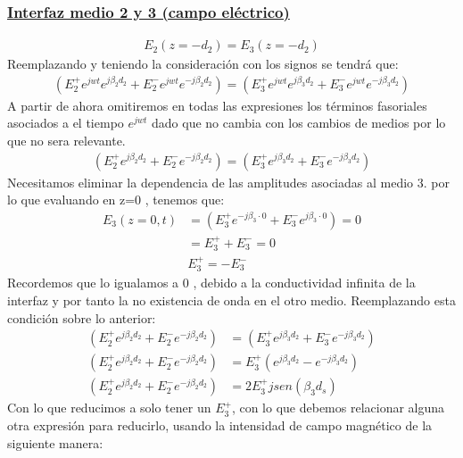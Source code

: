 \documentclass[
  11pt,
  letterpaper,
   addpoints,
   answers
  ]{exam}
\begin{document}
\begin{questions}
\begin{solution}
\begin{enumerate}
            \subsubsection*{\underline{Interfaz medio 2 y 3 (campo eléctrico)}}
            \begin{align}
                E_{2}(z=-d_{2}) = E_{3}(z=-d_{2})
            \end{align}
            Reemplazando y teniendo la consideración con los signos se tendrá que:
            \begin{align}
                (E_{2}^{+}e^{jwt}e^{j\beta_{2} d_{2}} + E_{2}^{-}e^{jwt}e^{-j\beta_{2} d_{2}})=(E_{3}^{+}e^{jwt}e^{j\beta_{3} d_{2}} + E_{3}^{-}e^{jwt}e^{-j\beta_{3} d_{2}}) 
            \end{align}
            A partir de ahora omitiremos en todas las expresiones los términos fasoriales asociados a el tiempo $e^{jwt}$ dado que no cambia con los cambios de medios por lo que no sera relevante.
            \begin{align}
                (E_{2}^{+}e^{j\beta_{2} d_{2}} + E_{2}^{-}e^{-j\beta_{2} d_{2}})=(E_{3}^{+}e^{j\beta_{3} d_{2}} + E_{3}^{-}e^{-j\beta_{3} d_{2}}) 
            \end{align}
            Necesitamos eliminar la dependencia de las amplitudes asociadas al medio 3. por lo que evaluando en z=0 , tenemos que:
            \begin{align}
                E_{3}(z=0,t) &= (E_{3}^{+}e^{-j\beta_{3} \cdot 0} + E_{3}^{-}e^{j\beta_{3} \cdot 0}) = 0\\
                      &= E_{3}^{+} + E_{3}^{-} = 0\\
                      &E_{3}^{+} = -E_{3}^{-}
            \end{align}
            Recordemos que lo igualamos a 0 , debido a la conductividad infinita de la interfaz y por tanto la no existencia de onda en el otro medio. Reemplazando esta condición sobre lo anterior:
            \begin{align}
                (E_{2}^{+}e^{j\beta_{2} d_{2}} + E_{2}^{-}e^{-j\beta_{2} d_{2}})&=(E_{3}^{+}e^{j\beta_{3} d_{2}} + E_{3}^{-}e^{-j\beta_{3} d_{2}})\\ 
                (E_{2}^{+}e^{j\beta_{2} d_{2}} + E_{2}^{-}e^{-j\beta_{2} d_{2}})&=E_{3}^{+}(e^{j\beta_{3}d_{2}}- e^{-j\beta_{3} d_{2}})\\
                (E_{2}^{+}e^{j\beta_{2} d_{2}} + E_{2}^{-}e^{-j\beta_{2} d_{2}})&=2 E_{3}^{+}jsen(\beta_{3}d_{s})
            \end{align}
            Con lo que reducimos a solo tener un $E_{3}^{+}$, con lo que debemos relacionar alguna otra expresión para reducirlo, usando la intensidad de campo magnético de la siguiente manera:

\end{enumerate}
\end{solution}
\end{questions}
\end{document}
